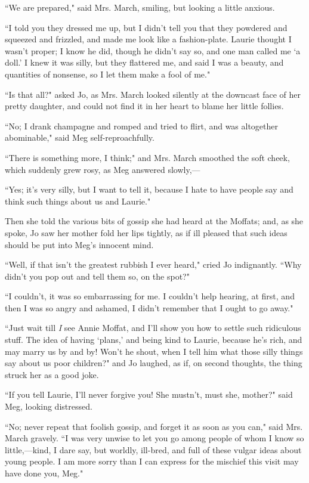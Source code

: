``We are prepared," said Mrs. March, smiling, but looking a little
anxious.

``I told you they dressed me up, but I didn't tell you
that they powdered and squeezed and frizzled, and made me look like a
fashion-plate. Laurie thought I wasn't proper; I know he
did, though he didn't say so, and one man called me
`a doll.' I knew it was silly, but they
flattered me, and said I was a beauty, and quantities of nonsense, so I
let them make a fool of me."

``Is that all?" asked Jo, as Mrs. March looked silently at the downcast
face of her pretty daughter, and could not find it in her heart to blame
her little follies.

``No; I drank champagne and romped and tried to flirt, and was altogether
abominable," said Meg self-reproachfully.

``There is something more, I think;" and Mrs. March smoothed the soft
cheek, which suddenly grew rosy, as Meg answered slowly,---

``Yes; it's very silly, but I want to tell it, because I
hate to have people say and think such things about us and Laurie."

Then she told the various bits of gossip she had heard at the Moffats;
and, as she spoke, Jo saw her mother fold her lips tightly, as if ill
pleased that such ideas should be put into Meg's
innocent mind.

``Well, if that isn't the greatest rubbish I ever heard,"
cried Jo indignantly. ``Why didn't you pop out and tell
them so, on the spot?"

``I couldn't, it was so embarrassing for me. I
couldn't help hearing, at first, and then I was so angry
and ashamed, I didn't remember that I ought to go away."

``Just wait till \emph{I} see Annie Moffat, and I'll show
you how to settle such ridiculous stuff. The idea of having
`plans,' and being kind to Laurie,
because he's rich, and may marry us by and by!
Won't he shout, when I tell him what those silly things
say about us poor children?" and Jo laughed, as if, on second thoughts,
the thing struck her as a good joke.

``If you tell Laurie, I'll never forgive you! She
mustn't, must she, mother?" said Meg, looking
distressed.

``No; never repeat that foolish gossip, and forget it as soon as you
can," said Mrs. March gravely. ``I was very unwise to let you go among
people of whom I know so little,---kind, I dare say, but worldly,
ill-bred, and full of these vulgar ideas about young people. I am more
sorry than I can express for the mischief this visit may have done you,
Meg."

